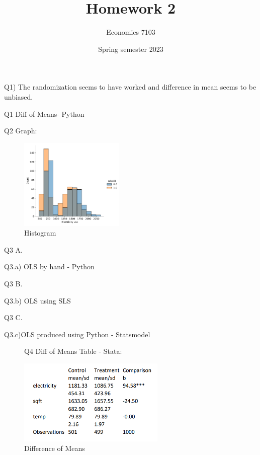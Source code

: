 \documentclass{article}
\title{Homework 2 }
\author{Economics 7103}
\date{Spring semester 2023}
\begin{document}
  
\maketitle


Q1) The randomization seems to have worked and difference in mean seems to be unbiased.
\begin{table}[ht]
    \centering
    
    \caption{Q1 Diff of Means- Python}
    \label{tab:mean_py}
\end{table}


Q2
Graph:
\begin{figure}[h]
    \centering
    \includegraphics[width=50mm]{Q2_hist.pdf}
    \caption{Histogram}
    \label{fig:hist_py}
\end{figure}


\begin{table}[ht!]
Q3
A.
    \centering
    
    \caption{Q3.a) OLS by hand - Python}
    \label{tab:ols_hand}
\end{table}


\begin{table}[ht!]
Q3
B.
    \centering
    
    \caption{Q3.b) OLS using SLS}
    \label{tab:ols_sls}
\end{table}

\begin{table}[h!]
Q3
C.  \centering
    
    \caption{Q3.c)OLS produced using Python - Statsmodel}
    \label{tab:olssm}
\end{table}



\begin{figure}[h!]
Q4
Diff of Means Table - Stata:

    \centering
    \includegraphics[width=70mm]{means_stata.png}
    \caption{Difference of Means}
    \label{fig:means_stata}
\end{figure}
\end{document}

